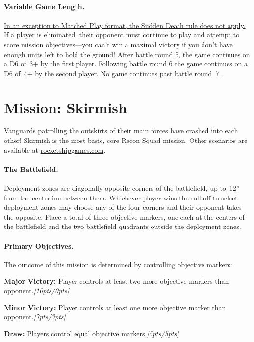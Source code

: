 
\paragraph{Variable Game Length.}
\underline{In an exception to Matched Play format, the Sudden Death
  rule does not apply.}  If a player is eliminated, their opponent
must continue to play and attempt to score mission objectives---you
can't win a maximal victory if you don't have enough units left to
hold the ground!  After battle round 5, the game continues on a D6
of~3+ by the first player.  Following battle round 6 the game
continues on a D6 of~4+ by the second player. No game continues past
battle round~7.



\section{Mission: Skirmish}

Vanguards patrolling the outskirts of their main forces have crashed
into each other!  Skirmish is the most basic, core Recon Squad
mission. Other scenarios are available at \url{rocketshipgames.com}.

\paragraph{The Battlefield.}  Deployment zones are diagonally opposite
corners of the battlefield, up to~12'' from the centerline between
them. Whichever player wins the roll-off to select deployment zones
may choose any of the four corners and their opponent takes the
opposite.  Place a total of three objective markers, one each at the
centers of the battlefield and the two battlefield quadrants outside
the deployment zones.

\paragraph{Primary Objectives.}
The outcome of this mission is determined by controlling objective
markers:

\begin{squishitemize}
\item \textbf{Major Victory:} Player controls at least two more
  objective markers than opponent.\hfill\emph{[10pts/0pts]}
\item \textbf{Minor Victory:} Player controls at least one more objective marker than opponent.\hfill \emph{[7pts/3pts]}
\item \textbf{Draw:} Players control equal objective markers.\hfill\emph{[5pts/5pts]}
\end{squishitemize}

